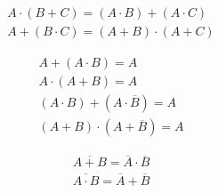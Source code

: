 \begin{multicols}{2}
\begin{CheatsheetEntryFrame}


    \end{CheatsheetEntryFrame}

    \begin{CheatsheetEntryFrame}



        \begin{gather*}
            A \cdot (B + C) = (A \cdot B) + (A \cdot C) \\
            A + (B \cdot C) = (A + B) \cdot (A + C)
        \end{gather*}

        \begin{gather*}
            A + (A \cdot B) = A \\
            A \cdot (A + B) = A \\
            (A \cdot B) + (A \cdot \overline{B}) = A \\
            (A + B) \cdot (A + \overline{B}) = A
        \end{gather*}

        \begin{gather*}
            \overline{A + B} = \overline{A} \cdot \overline{B} \\
            \overline{A \cdot B} = \overline{A} + \overline{B}
        \end{gather*}

    \end{CheatsheetEntryFrame}

\end{multicols}

